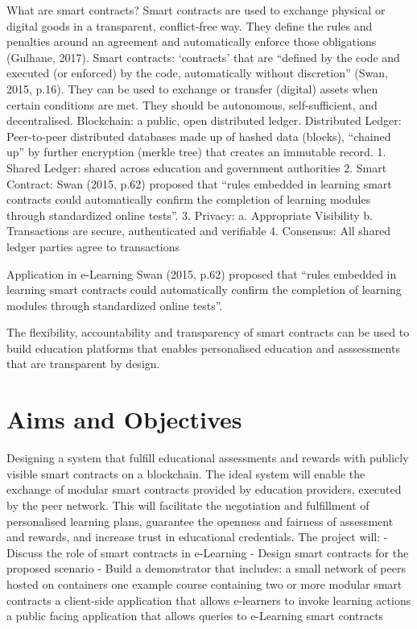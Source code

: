 What are smart contracts?
Smart contracts are used to exchange physical or digital goods in a transparent, conflict-free way. 
They define the rules and penalties around an agreement and automatically enforce those obligations (Gulhane, 2017). 
Smart contracts: ‘contracts’ that are “defined by the code and executed (or enforced) by the code, automatically without 
discretion” (Swan, 2015, p.16). They can be used to exchange or transfer (digital) assets when certain conditions are met. 
They should be autonomous, self-sufficient, and decentralised.
Blockchain: a public, open distributed ledger.
Distributed Ledger: Peer-to-peer distributed databases made up of hashed data (blocks), “chained up” by further encryption 
(merkle tree) that creates an immutable record.
1. Shared Ledger: 
shared across education and government authorities
2. Smart Contract: 
Swan (2015, p.62) proposed that “rules embedded in learning smart contracts could automatically confirm the completion of learning modules through standardized online tests”.
3. Privacy: 
a. Appropriate Visibility
b. Transactions are secure, authenticated and verifiable
4. Consensus: 
All shared ledger parties agree to transactions


Application in e-Learning
Swan (2015, p.62) proposed that “rules embedded in learning smart contracts could automatically confirm the completion 
of learning modules through standardized online tests”.

The flexibility, accountability and transparency of smart contracts can be used to build education platforms that enables 
personalised education and asssessments that are transparent by design.

\section{Aims and Objectives} %

Designing a system that fulfill educational assessments and rewards with publicly visible smart contracts on a blockchain. 
The ideal system will enable the exchange of modular smart contracts provided by education providers, executed by the peer network. This will facilitate the negotiation and fulfillment of personalised learning plans, guarantee the openness and fairness of assessment and rewards, and increase trust in educational credentials.
The project will:
-	Discuss the role of smart contracts in e-Learning
-	Design smart contracts for the proposed scenario
-	Build a demonstrator that includes:
a small network of peers hosted on containers
one example course containing two or more modular smart contracts
a client-side application that allows e-learners to invoke learning actions
a public facing application that allows queries to e-Learning smart contracts

